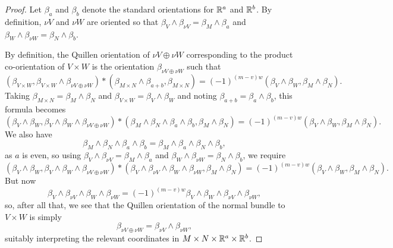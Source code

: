 \begin{proof}
	Let $\beta_a$ and $\beta_b$ denote the standard orientations for $\mathbb{R}^a$ and $\mathbb{R}^b$.
	By definition, $\nu V$ and $\nu W$ are oriented so that $\beta_V \wedge \beta_{\nu V} = \beta_M \wedge \beta_a$ and $\beta_W \wedge \beta_{\nu W} = \beta_N \wedge \beta_b$.

	By definition, the Quillen orientation of $\nu V \oplus \nu W$ corresponding to the product co-orientation of $V \times W$ is the orientation $\beta_{\nu V \oplus \nu W}$ such that
	$$(\beta_{V \times W}, \beta_{V \times W} \wedge \beta_{\nu V \oplus \nu W})*(\beta_{M \times N} \wedge \beta_{a+b},\beta_{M \times N}) = (-1)^{(m-v)w}(\beta_V \wedge \beta_W,\beta_M \wedge \beta_N).$$
	Taking $\beta_{M \times N} = \beta_M \wedge \beta_N$ and $\beta_{V \times W} = \beta_V \wedge \beta_W$ and noting $\beta_{a+b} = \beta_a \wedge \beta_b$, this formula becomes
	$$(\beta_V \wedge \beta_W, \beta_V \wedge \beta_W \wedge \beta_{\nu V \oplus \nu W})*(\beta_M \wedge \beta_N \wedge \beta_a \wedge \beta_b,\beta_M \wedge \beta_N) = (-1)^{(m-v)w}(\beta_V \wedge \beta_W,\beta_M \wedge \beta_N).$$
	We also have $$\beta_M \wedge \beta_N \wedge \beta_a \wedge \beta_b = \beta_M \wedge \beta_a \wedge \beta_N \wedge \beta_b,$$ as $a$ is even, so using $\beta_V \wedge \beta_{\nu V} = \beta_M \wedge \beta_a$ and $\beta_W \wedge \beta_{\nu W} = \beta_N \wedge \beta_b$, we require
	$$(\beta_V \wedge \beta_W, \beta_V \wedge \beta_W \wedge \beta_{\nu V \oplus \nu W})*(\beta_V \wedge \beta_{\nu V}\wedge\beta_W \wedge \beta_{\nu W} ,\beta_M \wedge \beta_N) = (-1)^{(m-v)w}(\beta_V \wedge \beta_W,\beta_M \wedge \beta_N).$$
	But now $$\beta_V \wedge \beta_{\nu V}\wedge\beta_W \wedge \beta_{\nu W} = (-1)^{(m-v)w} \beta_V \wedge \beta_{W}\wedge\beta_{\nu V} \wedge \beta_{\nu W},$$
	so, after all that, we see that the Quillen orientation of the normal bundle to $V \times W$ is simply $$\beta_{\nu V \oplus \nu W} = \beta_{\nu V} \wedge \beta_{\nu W},$$
	suitably interpreting the relevant coordinates in $M \times N \times \mathbb{R}^a \times \mathbb{R}^b$.
\end{proof}

